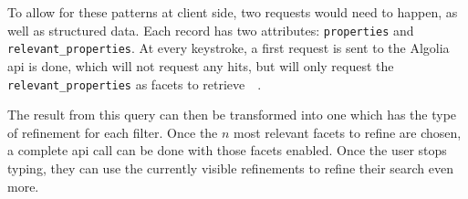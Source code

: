 To allow for these patterns at client side, two requests would need to happen, as well as structured data. Each record has two \glspl{attribute}: {\tt properties} and {\tt relevant\_properties}. At every keystroke, a first request is sent to the Algolia \acrshort{api} is done, which will not request any hits, but will only request the {\tt relevant\_properties} as facets to retrieve~\cite{dynamic-faceting}~.

The result from this query can then be transformed into one which has the type of refinement for each filter. Once the $n$ most relevant facets to refine are chosen, a complete \acrshort{api} call can be done with those facets enabled. Once the user stops typing, they can use the currently visible \glspl{refinement} to refine their search even more.

